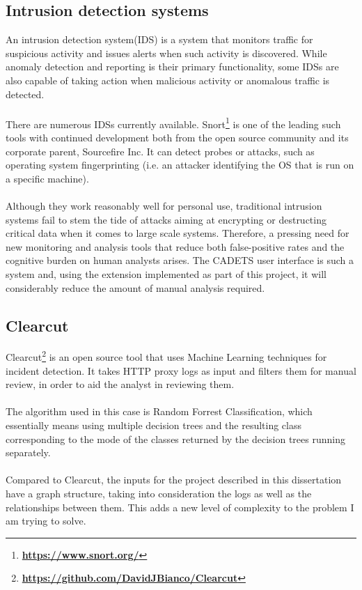 	\subsection{Intrusion detection systems}
	An intrusion detection system(IDS) is a system that monitors traffic for suspicious activity and issues alerts when such activity is discovered. While anomaly detection and reporting is their primary functionality, some IDSs are also capable of taking action when malicious activity or anomalous traffic is detected. 
	\\ \\
	There are numerous IDSs currently available. Snort\footnote{\textbf{\url{https://www.snort.org/}}} is one of the leading such tools with continued development both from the open source community and its corporate parent, Sourcefire Inc. It can detect probes or attacks, such as operating system fingerprinting (i.e. an attacker identifying the OS that is run on a specific machine). 
	\\ \\
	Although they work reasonably well for personal use, traditional intrusion systems fail to stem the tide of attacks aiming at encrypting or destructing critical data when it comes to large scale systems. Therefore, a pressing need for new monitoring and analysis tools that reduce both false-positive rates and the cognitive burden on human analysts arises. The CADETS user interface is such a system and, using the extension implemented as part of this project, it will considerably reduce the amount of manual analysis required. 
	
	\subsection{Clearcut}
	Clearcut\footnote{\textbf{\url{https://github.com/DavidJBianco/Clearcut}}} is an open source tool that uses Machine Learning techniques for incident detection. It takes HTTP proxy logs as input and filters them for manual review, in order to aid the analyst in reviewing them. 
	\\ \\ 
	The algorithm used in this case is Random Forrest Classification, which essentially means using multiple decision trees and the resulting class corresponding to the mode of the classes returned by the decision trees running separately. 
	\\ \\
	Compared to Clearcut, the inputs for the project described in this dissertation have a graph structure, taking into consideration the logs as well as the relationships between them. This adds a new level of complexity to the problem I am trying to solve.
	
